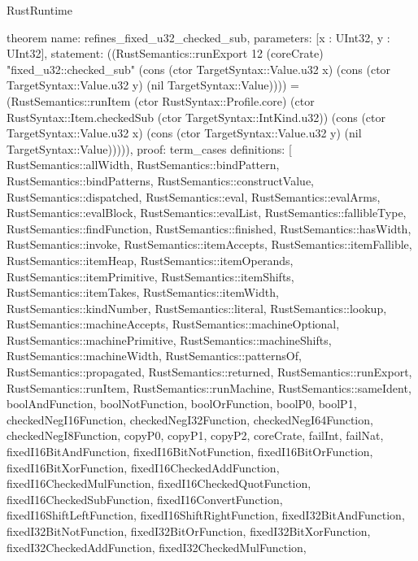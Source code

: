 \begin{lexlean}{RustRuntime}
\begin{semanticmodule}
theorem{
  name: refines_fixed_u32_checked_sub,
  parameters: [x : UInt32, y : UInt32],
  statement: ((RustSemantics::runExport 12 (coreCrate) "fixed_u32::checked_sub" (cons (ctor TargetSyntax::Value.u32 x) (cons (ctor TargetSyntax::Value.u32 y) (nil TargetSyntax::Value)))) = (RustSemantics::runItem (ctor RustSyntax::Profile.core) (ctor RustSyntax::Item.checkedSub (ctor TargetSyntax::IntKind.u32)) (cons (ctor TargetSyntax::Value.u32 x) (cons (ctor TargetSyntax::Value.u32 y) (nil TargetSyntax::Value))))),
  proof: term_cases{
    definitions: [
      RustSemantics::allWidth,
      RustSemantics::bindPattern,
      RustSemantics::bindPatterns,
      RustSemantics::constructValue,
      RustSemantics::dispatched,
      RustSemantics::eval,
      RustSemantics::evalArms,
      RustSemantics::evalBlock,
      RustSemantics::evalList,
      RustSemantics::fallibleType,
      RustSemantics::findFunction,
      RustSemantics::finished,
      RustSemantics::hasWidth,
      RustSemantics::invoke,
      RustSemantics::itemAccepts,
      RustSemantics::itemFallible,
      RustSemantics::itemHeap,
      RustSemantics::itemOperands,
      RustSemantics::itemPrimitive,
      RustSemantics::itemShifts,
      RustSemantics::itemTakes,
      RustSemantics::itemWidth,
      RustSemantics::kindNumber,
      RustSemantics::literal,
      RustSemantics::lookup,
      RustSemantics::machineAccepts,
      RustSemantics::machineOptional,
      RustSemantics::machinePrimitive,
      RustSemantics::machineShifts,
      RustSemantics::machineWidth,
      RustSemantics::patternsOf,
      RustSemantics::propagated,
      RustSemantics::returned,
      RustSemantics::runExport,
      RustSemantics::runItem,
      RustSemantics::runMachine,
      RustSemantics::sameIdent,
      boolAndFunction,
      boolNotFunction,
      boolOrFunction,
      boolP0,
      boolP1,
      checkedNegI16Function,
      checkedNegI32Function,
      checkedNegI64Function,
      checkedNegI8Function,
      copyP0,
      copyP1,
      copyP2,
      coreCrate,
      failInt,
      failNat,
      fixedI16BitAndFunction,
      fixedI16BitNotFunction,
      fixedI16BitOrFunction,
      fixedI16BitXorFunction,
      fixedI16CheckedAddFunction,
      fixedI16CheckedMulFunction,
      fixedI16CheckedQuotFunction,
      fixedI16CheckedSubFunction,
      fixedI16ConvertFunction,
      fixedI16ShiftLeftFunction,
      fixedI16ShiftRightFunction,
      fixedI32BitAndFunction,
      fixedI32BitNotFunction,
      fixedI32BitOrFunction,
      fixedI32BitXorFunction,
      fixedI32CheckedAddFunction,
      fixedI32CheckedMulFunction,
}}
\end{semanticmodule}
\end{lexlean}
